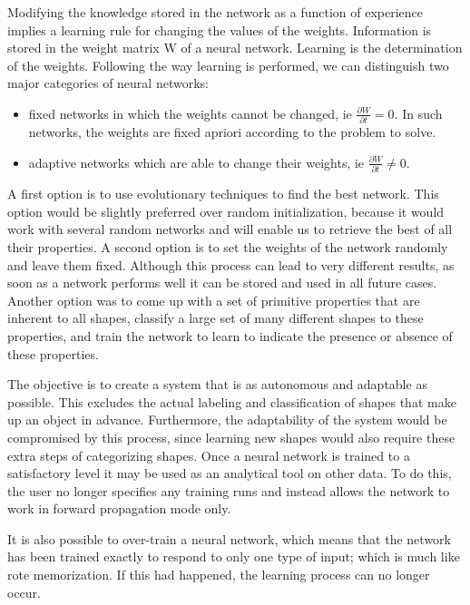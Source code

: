 \documentclass[9pt,shortpaper,twoside,web]{ieeecolor}
\begin{document}
Modifying the knowledge stored in the network as a function of experience implies a learning rule for changing the values of the weights.
Information is stored in the weight matrix W of a neural network. Learning is the determination of the weights. Following the way learning is performed, we can distinguish two major categories of neural networks:

\begin{itemize}
\item fixed networks in which the weights cannot be changed, ie $\frac{\partial W}{\partial t} = 0$. In such networks, the weights are fixed apriori according to the problem to solve.

\item adaptive networks which are able to change their weights, ie  $\frac{\partial W}{\partial t} \neq 0$.
\end{itemize}

A first option is to use evolutionary techniques to find the best network. This option would be slightly preferred over random initialization, because it would work with several random networks and will enable us to retrieve the best of all their properties. A second option is to set the weights of the network randomly and leave them fixed. Although this process can lead to very different results, as soon as a network performs well it can be stored and used in all future cases. Another option was to come up with a set of primitive properties that are inherent to all shapes, classify a large set of many different shapes to these properties, and train the network to learn to indicate the presence or absence of these properties.

The objective is to create a system that is as autonomous and adaptable as possible. This excludes the actual labeling and classification of shapes that make up an object in advance. Furthermore, the adaptability of the system would be compromised by this process, since learning new shapes would also require these extra steps of categorizing shapes. 
Once a neural network is trained to a satisfactory level it may be used as an analytical tool on other data. To do this, the user no longer specifies any training runs and instead allows the network to work in forward propagation mode only. 

It is also possible to over-train a neural network, which means that the network has been trained exactly to respond to only one type of input; which is much like rote memorization. If this had happened, the learning process can no longer occur.
\end{document}
